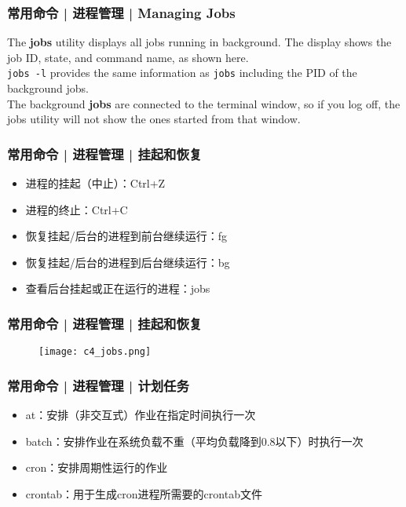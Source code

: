 \begin{frame}[fragile]
  \frametitle{常用命令 | 进程管理 | Managing Jobs}
  The \textbf{jobs} utility displays all jobs running in background. The display shows the job ID, state, and command name, as shown here.\\
  \vspace{0.2cm}
  \verb|jobs -l| provides the same information as \verb|jobs| including the PID of the background jobs.\\
  \vspace{0.2cm}
  The background \textbf{jobs} are connected to the terminal window, so if you log off, the jobs utility will not show the ones started from that window.
\end{frame}

\begin{frame}
  \frametitle{常用命令 | 进程管理 | \alert{挂起和恢复}}
  \begin{itemize}
    \item 进程的挂起（中止）：Ctrl+Z
    \item 进程的终止：Ctrl+C
    \item 恢复挂起/后台的进程到前台继续运行：fg
    \item 恢复挂起/后台的进程到后台继续运行：bg
    \item 查看后台挂起或正在运行的进程：jobs
  \end{itemize}
\end{frame}

\begin{frame}
  \frametitle{常用命令 | 进程管理 | 挂起和恢复}
  \begin{figure}
    \centering
    \texttt{[image: c4\_jobs.png]}
  \end{figure}
\end{frame}

\begin{frame}
  \frametitle{常用命令 | 进程管理 | \alert{计划任务}}
  \begin{itemize}
    \item at：安排（非交互式）作业在指定时间执行一次
    \item batch：安排作业在系统负载不重（平均负载降到0.8以下）时执行一次
    \item cron：安排周期性运行的作业
    \item crontab：用于生成cron进程所需要的crontab文件
  \end{itemize}
\end{frame}

